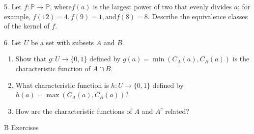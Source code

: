 \documentclass[10pt,]{book}
\theoremstyle{plain}
\theoremstyle{definition}
\theoremstyle{definition}
\theoremstyle{definition}
\begin{document}
\begin{exercisegroup}
\begin{enumerate}[label=\alph*]
\end{enumerate}
%
\par\smallskip
\item[5.]\hypertarget{exercise-5}{} Let \(f:\mathbb{P}\to \mathbb{P}\), where\(f(a)\) is the largest power of two that evenly divides \(a\); for example, \(f(12)=4,f(9)=1,\text{and}
f(8)=8\). Describe the equivalence classes of the kernel of \(f\).%
\par\smallskip
\item[6.]\hypertarget{exercise-6}{} Let \(U\) be a set with subsets \(A\) and \(B\).%
\par
\leavevmode%
\begin{enumerate}[label=\alph*]
\item\hypertarget{li-22}{} Show that \(g:U\to \{0,1\}\) defined by \(g(a)=\min \left(C_A(a),C_B(a)\right)\) is the characteristic function of \(A\cap B\).%
\item\hypertarget{li-23}{} What characteristic function is \(h:U\to \{0,1\}\) defined by \(h(a)=\max \left(C_A(a),C_B(a)\right)\)?%
\item\hypertarget{li-24}{} How are the characteristic functions of \(A\) and \(A^c\) related?%
\end{enumerate}
%
\par\smallskip
\end{exercisegroup}
\par\smallskip\noindent
\hypertarget{exercisegroup-2}{}\typeout{************************************************}
\typeout{************************************************}
B Exercises%
\end{document}
